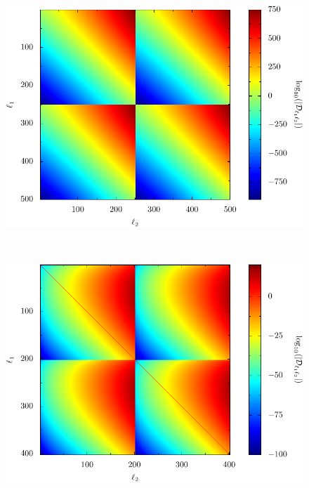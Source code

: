 \begin{figure}
    \begin{minipage}[b]{\linewidth}
    \centering
    \includegraphics[scale=0.95]{plots/numeric/matrix/matrix1.pdf}
    \end{minipage}
    \ \\
    \begin{minipage}[b]{\linewidth}
    \centering
    \includegraphics[scale=0.95]{plots/numeric/matrix/matrix2.pdf}
    \end{minipage}


\end{figure}
